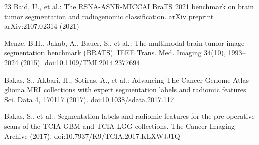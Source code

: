 \documentclass[runningheads]{llncs}
\begin{document}
\begin{thebibliography}{23}
Baid, U., et al.: The RSNA-ASNR-MICCAI BraTS 2021 benchmark on brain tumor segmentation and radiogenomic classification. arXiv preprint arXiv:2107.02314 (2021)

Menze, B.H., Jakab, A., Bauer, S., et al.: The multimodal brain tumor image segmentation benchmark (BRATS). IEEE Trans. Med. Imaging 34(10), 1993--2024 (2015). doi:10.1109/TMI.2014.2377694

Bakas, S., Akbari, H., Sotiras, A., et al.: Advancing The Cancer Genome Atlas glioma MRI collections with expert segmentation labels and radiomic features. Sci. Data 4, 170117 (2017). doi:10.1038/sdata.2017.117

Bakas, S., et al.: Segmentation labels and radiomic features for the pre-operative scans of the TCIA-GBM and TCIA-LGG collections. The Cancer Imaging Archive (2017). doi:10.7937/K9/TCIA.2017.KLXWJJ1Q

\end{thebibliography}
\end{document}
